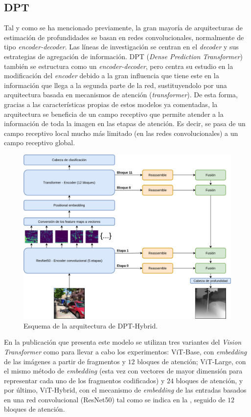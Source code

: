 \subsection{DPT}\label{DPT}
Tal y como se ha mencionado previamente, la gran mayoría de arquitecturas de estimación de profundidades se basan en redes convolucionales, normalmente de tipo \textit{encoder-decoder}. Las líneas de investigación se centran en el \textit{decoder} y sus estrategias de agregación de información. DPT (\textit{Dense Prediction Transformer}) \cite{visiontransformersDPT} también se estructura como un \textit{encoder-decoder}, pero centra su estudio en la modificación del \textit{encoder} debido a la gran influencia que tiene este en la información que llega a la segunda parte de la red, sustituyendolo por una arquitectura basada en mecanismos de atención (\textit{transformer}). De esta forma, gracias a las características propias de estos modelos ya comentadas, la arquitectura se beneficia de un campo receptivo que permite atender a la información de toda la imagen en las etapas de atención. Es decir, se pasa de un campo receptivo local mucho más limitado (en las redes convolucionales) a un campo receptivo global.

\begin{figure}[H]
\centering
\includegraphics[width=\linewidth]{imagenes/DPT-general.png} 
\captionsetup{width=.7\linewidth}
\caption{Esquema de la arquitectura de DPT-Hybrid.}
\label{fig:dpt-hybrid}
\end{figure}

En la publicación que presenta este modelo se utilizan tres variantes del \textit{Vision Transformer} como  para llevar a cabo los experimentos: ViT-Base, con \textit{embedding} de las imágenes a partir de fragmentos y $12$ bloques de atención; ViT-Large, con el mismo método de \textit{embedding} (esta vez con vectores de mayor dimensión para representar cada uno de los fragmentos codificados) y $24$ bloques de atención, y por último, ViT-Hybrid, con el mecanismo de \textit{embedding} de las entradas basados en una red convolucional (ResNet50) tal como se indica en la , seguido de $12$ bloques de atención.


